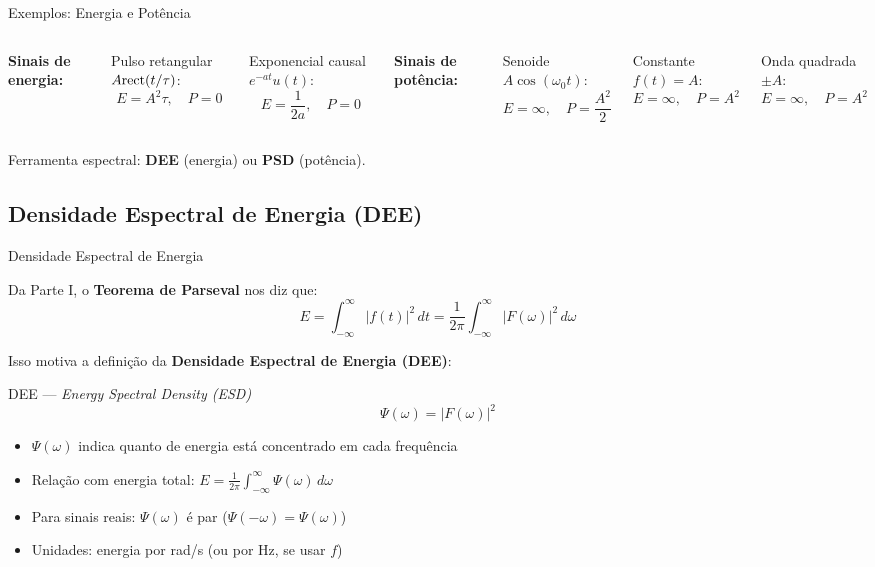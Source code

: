 \begin{frame}{Exemplos: Energia e Potência}

\begin{columns}[T]
\textbf{Sinais de energia:}

Pulso retangular $A\text{rect}(t/\tau)$:
\[
E = A^2\tau, \quad P = 0
\]

Exponencial causal $e^{-at}u(t)$:
\[
E = \frac{1}{2a}, \quad P = 0
\]

\textbf{Sinais de potência:}

Senoide $A\cos(\omega_0 t)$:
\[
E = \infty, \quad P = \frac{A^2}{2}
\]

Constante $f(t) = A$:
\[
E = \infty, \quad P = A^2
\]

Onda quadrada $\pm A$:
\[
E = \infty, \quad P = A^2
\]
\end{columns}

\vspace{0.1cm}
{\small Ferramenta espectral: \textbf{DEE} (energia) ou \textbf{PSD} (potência).}

\end{frame}

\subsection{Densidade Espectral de Energia (DEE)}

\begin{frame}{Densidade Espectral de Energia}

Da Parte I, o \textbf{Teorema de Parseval} nos diz que:
\[
E = \int_{-\infty}^{\infty} |f(t)|^2\, dt = \frac{1}{2\pi} \int_{-\infty}^{\infty} |F(\omega)|^2\, d\omega
\]

Isso motiva a definição da \textbf{Densidade Espectral de Energia (DEE)}:

\begin{block}{DEE --- \textit{Energy Spectral Density (ESD)}}
\vspace{-2mm}
\[
\Psi(\omega) = |F(\omega)|^2
\]
\vspace{-2mm}
\end{block}

\begin{itemize}
\item $\Psi(\omega)$ indica quanto de energia está concentrado em cada frequência
\item Relação com energia total: $\displaystyle E = \frac{1}{2\pi} \int_{-\infty}^{\infty} \Psi(\omega)\, d\omega$
\item Para sinais reais: $\Psi(\omega)$ é par ($\Psi(-\omega) = \Psi(\omega)$)
\item Unidades: energia por rad/s (ou por Hz, se usar $f$)
\end{itemize}

\end{frame}

